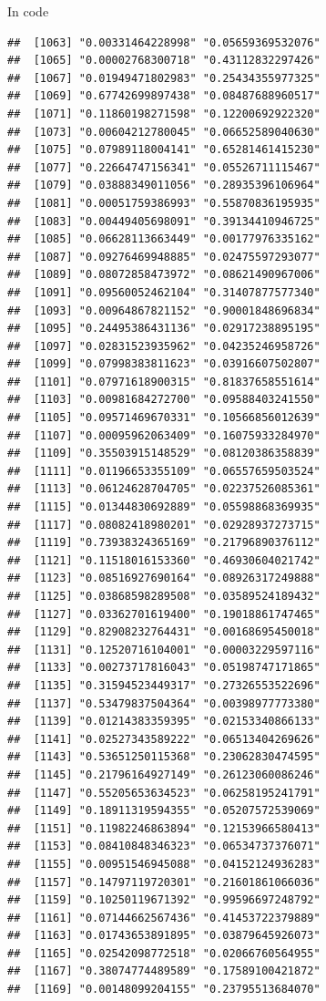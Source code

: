 \documentclass[ignorenonframetext,]{beamer}
\begin{document}
\begin{frame}[fragile]{In code}
\begin{verbatim}
##  [1063] "0.00331464228998" "0.05659369532076"
##  [1065] "0.00002768300718" "0.43112832297426"
##  [1067] "0.01949471802983" "0.25434355977325"
##  [1069] "0.67742699897438" "0.08487688960517"
##  [1071] "0.11860198271598" "0.12200692922320"
##  [1073] "0.00604212780045" "0.06652589040630"
##  [1075] "0.07989118004141" "0.65281461415230"
##  [1077] "0.22664747156341" "0.05526711115467"
##  [1079] "0.03888349011056" "0.28935396106964"
##  [1081] "0.00051759386993" "0.55870836195935"
##  [1083] "0.00449405698091" "0.39134410946725"
##  [1085] "0.06628113663449" "0.00177976335162"
##  [1087] "0.09276469948885" "0.02475597293077"
##  [1089] "0.08072858473972" "0.08621490967006"
##  [1091] "0.09560052462104" "0.31407877577340"
##  [1093] "0.00964867821152" "0.90001848696834"
##  [1095] "0.24495386431136" "0.02917238895195"
##  [1097] "0.02831523935962" "0.04235246958726"
##  [1099] "0.07998383811623" "0.03916607502807"
##  [1101] "0.07971618900315" "0.81837658551614"
##  [1103] "0.00981684272700" "0.09588403241550"
##  [1105] "0.09571469670331" "0.10566856012639"
##  [1107] "0.00095962063409" "0.16075933284970"
##  [1109] "0.35503915148529" "0.08120386358839"
##  [1111] "0.01196653355109" "0.06557659503524"
##  [1113] "0.06124628704705" "0.02237526085361"
##  [1115] "0.01344830692889" "0.05598868369935"
##  [1117] "0.08082418980201" "0.02928937273715"
##  [1119] "0.73938324365169" "0.21796890376112"
##  [1121] "0.11518016153360" "0.46930604021742"
##  [1123] "0.08516927690164" "0.08926317249888"
##  [1125] "0.03868598289508" "0.03589524189432"
##  [1127] "0.03362701619400" "0.19018861747465"
##  [1129] "0.82908232764431" "0.00168695450018"
##  [1131] "0.12520716104001" "0.00003229597116"
##  [1133] "0.00273717816043" "0.05198747171865"
##  [1135] "0.31594523449317" "0.27326553522696"
##  [1137] "0.53479837504364" "0.00398977773380"
##  [1139] "0.01214383359395" "0.02153340866133"
##  [1141] "0.02527343589222" "0.06513404269626"
##  [1143] "0.53651250115368" "0.23062830474595"
##  [1145] "0.21796164927149" "0.26123060086246"
##  [1147] "0.55205653634523" "0.06258195241791"
##  [1149] "0.18911319594355" "0.05207572539069"
##  [1151] "0.11982246863894" "0.12153966580413"
##  [1153] "0.08410848346323" "0.06534737376071"
##  [1155] "0.00951546945088" "0.04152124936283"
##  [1157] "0.14797119720301" "0.21601861066036"
##  [1159] "0.10250119671392" "0.99596697248792"
##  [1161] "0.07144662567436" "0.41453722379889"
##  [1163] "0.01743653891895" "0.03879645926073"
##  [1165] "0.02542098772518" "0.02066760564955"
##  [1167] "0.38074774489589" "0.17589100421872"
##  [1169] "0.00148099204155" "0.23795513684070"

\end{verbatim}
\end{frame}
\end{document}
